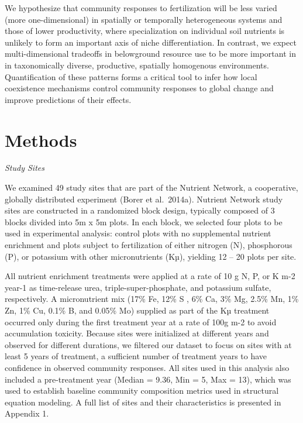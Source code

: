 \documentclass[twoside,12pt,final]{ucthesis-CA2012}
\begin{document}
\begin{ucmainmatter}
We hypothesize that community responses to fertilization will be less varied (more one-dimensional) in spatially or temporally heterogeneous systems and those of lower productivity, where specialization on individual soil nutrients is unlikely to form an important axis of niche differentiation. In contrast, we expect multi-dimensional tradeoffs in belowground resource use to be more important in in taxonomically diverse, productive, spatially homogenous environments. Quantification of these patterns forms a critical tool to infer how local coexistence mechanisms control community responses to global change and improve predictions of their effects.

\hypertarget{methods}{%
\section{Methods}\label{methods}}

\emph{Study Sites}

We examined 49 study sites that are part of the Nutrient Network, a cooperative, globally distributed experiment (Borer et al.~2014a). Nutrient Network study sites are constructed in a randomized block design, typically composed of 3 blocks divided into 5m x 5m plots. In each block, we selected four plots to be used in experimental analysis: control plots with no supplemental nutrient enrichment and plots subject to fertilization of either nitrogen (N), phosphorous (P), or potassium with other micronutrients (Kµ), yielding 12 -- 20 plots per site.

All nutrient enrichment treatments were applied at a rate of 10 g N, P, or K m-2 year-1 as time-release urea, triple-super-phosphate, and potassium sulfate, respectively. A micronutrient mix (17\% Fe, 12\% S , 6\% Ca, 3\% Mg, 2.5\% Mn, 1\% Zn, 1\% Cu, 0.1\% B, and 0.05\% Mo) supplied as part of the Kµ treatment occurred only during the first treatment year at a rate of 100g m-2 to avoid accumulation toxicity.
Because sites were initialized at different years and observed for different durations, we filtered our dataset to focus on sites with at least 5 years of treatment, a sufficient number of treatment years to have confidence in observed community responses. All sites used in this analysis also included a pre-treatment year (Median = 9.36, Min = 5, Max = 13), which was used to establish baseline community composition metrics used in structural equation modeling. A full list of sites and their characteristics is presented in Appendix 1.


\end{ucmainmatter}
\end{document}
